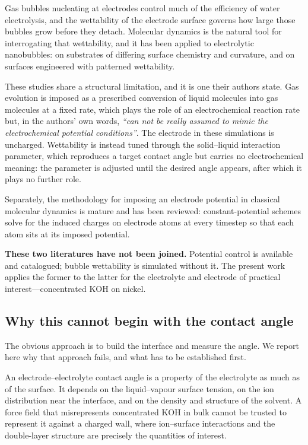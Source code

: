 \documentclass[11pt,a4paper]{article}
\begin{document}
Gas bubbles nucleating at electrodes control much of the efficiency of water electrolysis, and the
wettability of the electrode surface governs how large those bubbles grow before they detach.
Molecular dynamics is the natural tool for interrogating that wettability, and it has been applied to
electrolytic nanobubbles: on substrates of differing surface chemistry and curvature, and on
surfaces engineered with patterned wettability.

These studies share a structural limitation, and it is one their authors state. Gas evolution is
imposed as a prescribed conversion of liquid molecules into gas molecules at a fixed rate, which
plays the role of an electrochemical reaction rate but, in the authors' own words, \emph{``can not be
really assumed to mimic the electrochemical potential conditions''}. The electrode in these
simulations is uncharged. Wettability is instead tuned through the solid--liquid interaction
parameter, which reproduces a target contact angle but carries no electrochemical meaning: the
parameter is adjusted until the desired angle appears, after which it plays no further role.

Separately, the methodology for imposing an electrode potential in classical molecular dynamics is
mature and has been reviewed: constant-potential schemes solve for the induced charges on electrode
atoms at every timestep so that each atom sits at its imposed potential.

\textbf{These two literatures have not been joined.} Potential control is available and catalogued;
bubble wettability is simulated without it. The present work applies the former to the latter for
the electrolyte and electrode of practical interest---concentrated KOH on nickel.

\subsection{Why this cannot begin with the contact angle}

The obvious approach is to build the interface and measure the angle. We report here why that
approach fails, and what has to be established first.

An electrode--electrolyte contact angle is a property of the electrolyte as much as of the surface.
It depends on the liquid--vapour surface tension, on the ion distribution near the interface, and on
the density and structure of the solvent. A force field that misrepresents concentrated KOH in bulk
cannot be trusted to represent it against a charged wall, where ion--surface interactions and the
double-layer structure are precisely the quantities of interest.
\end{document}
